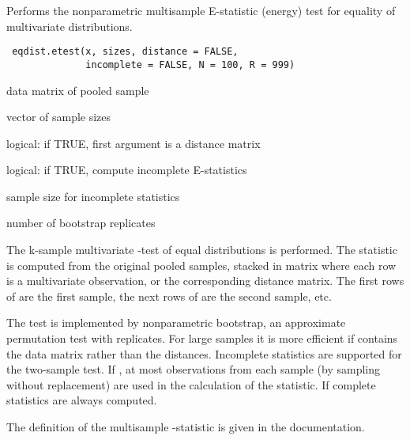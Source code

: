 \documentclass{article}
\begin{document}
\begin{Description}\relax
Performs the nonparametric multisample E-statistic (energy) test
for equality of multivariate distributions.
\end{Description}
\begin{Usage}
\begin{verbatim}
 eqdist.etest(x, sizes, distance = FALSE, 
              incomplete = FALSE, N = 100, R = 999)
\end{verbatim}
\end{Usage}
\begin{Arguments}
\begin{ldescription}
\item[\code{x}] data matrix of pooled sample
\item[\code{sizes}] vector of sample sizes
\item[\code{distance}] logical: if TRUE, first argument is a distance matrix
\item[\code{incomplete}] logical: if TRUE, compute incomplete E-statistics
\item[\code{N}] sample size for incomplete statistics
\item[\code{R}] number of bootstrap replicates 
\end{ldescription}
\end{Arguments}
\begin{Details}\relax
The k-sample multivariate -test of equal distributions
is performed. The statistic is computed from the original
pooled samples, stacked in matrix  where each row
is a multivariate observation, or the corresponding distance matrix. The
first  rows of  are the first sample, the next
 rows of  are the second sample, etc.

The test is implemented by nonparametric bootstrap, an approximate 
permutation test with  replicates. For large samples it is
more efficient if  contains the data matrix rather than the
distances. Incomplete statistics are supported for the two-sample test. If
, at most  observations from each sample 
(by sampling without replacement) are used in the calculation of the statistic.
If  complete statistics are always computed.

The definition of the multisample -statistic is given in the 
 documentation.\end{Details}
\end{document}
